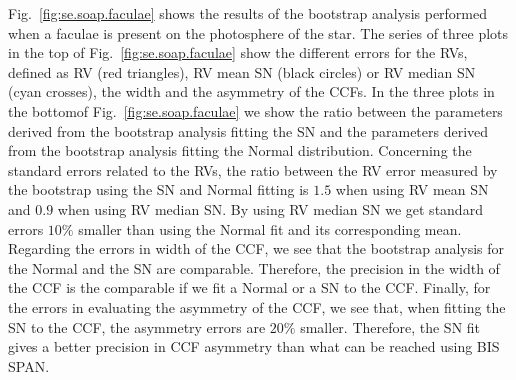 \documentclass[11pt, oneside]{article}
\begin{document}
{Fig.~\ref{fig:se.soap.faculae} shows the results of the bootstrap analysis performed when a faculae is present on the photosphere of the star. The series of three plots in the top of Fig.~\ref{fig:se.soap.faculae} show the different errors for the RVs, defined as RV (red triangles), RV mean SN (black circles) or RV median SN (cyan crosses), the width and the asymmetry of the CCFs. In the three plots in the bottomof Fig.~\ref{fig:se.soap.faculae} we show the ratio between the parameters derived from the bootstrap analysis fitting the SN and the parameters derived from the bootstrap analysis fitting the Normal distribution. Concerning the standard errors related to the RVs, the ratio between the RV error measured by the bootstrap using the SN and Normal fitting is $1.5$ when using RV mean SN and $0.9$ when using RV median SN. By using RV median SN we get standard errors $10\%$ smaller than using the Normal fit and its corresponding mean. Regarding the errors in width of the CCF, we see that the bootstrap analysis for the Normal and the SN are comparable. Therefore, the precision in the width of the CCF is the comparable if we fit a Normal or a SN to the CCF. Finally, for the errors in evaluating the asymmetry of the CCF, we see that, when fitting the SN to the CCF, the asymmetry errors are $20\%$ smaller. Therefore, the SN fit gives a better precision in CCF asymmetry than what can be reached using BIS SPAN.

}
\end{document}
